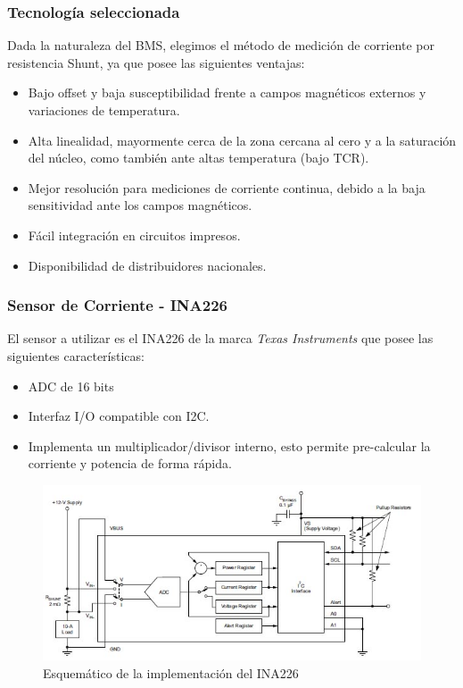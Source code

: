 \documentclass[10pt]{beamer}
\theoremstyle{remark}
\theoremstyle{definition}
\begin{document}
\begin{frame}[allowframebreaks]
  \frametitle{Tecnología seleccionada}
  Dada la naturaleza del BMS, elegimos el método de medición de corriente por
  resistencia Shunt, ya que posee las siguientes ventajas:

  \begin{itemize}
	\item Bajo offset y baja susceptibilidad frente a campos magnéticos externos
	  y variaciones de temperatura.
	\item Alta linealidad, mayormente cerca de la zona cercana al cero y a la
	  saturación del núcleo, como también ante altas temperatura (bajo TCR).
	\item Mejor resolución para mediciones de corriente continua, debido a la
	  baja sensitividad ante los campos magnéticos.
	\item Fácil integración en circuitos impresos.
	\item Disponibilidad de distribuidores nacionales.
  \end{itemize}

\end{frame}


\begin{frame}[allowframebreaks]
  \frametitle{Sensor de Corriente - INA226}
  El sensor a utilizar es el INA226 de la marca \emph{Texas Instruments} que
  posee las siguientes características:
  \begin{itemize}
	\item ADC de 16 bits
	\item Interfaz I/O compatible con I2C.
	\item Implementa un multiplicador/divisor interno, esto permite pre-calcular
	  la corriente y potencia de forma rápida.
  \end{itemize}

  \framebreak

  \begin{figure}[h!]
	\includegraphics[width=1\textwidth]{./images/INA226-Common_Implementation.jpg}
	\caption{Esquemático de la implementación del INA226}
	\label{sch_ina226}
  \end{figure}

\end{frame}
\end{document}
